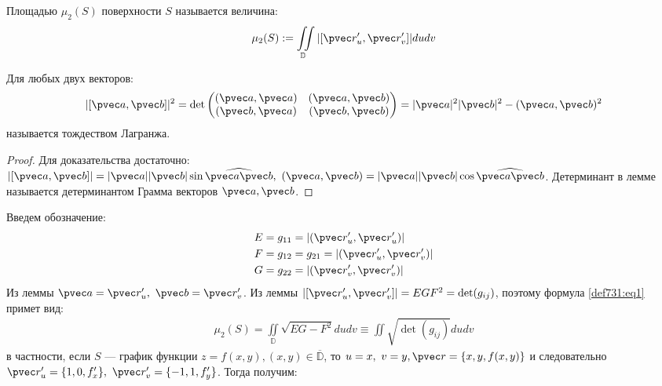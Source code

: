 \begin{definition}
  \label{def731}
  Площадью $\mu_2(S)$ поверхности $S$ называется величина:
  \begin{gather}
    \mu_2(S) := \iint\limits_{\mathbb{D}} |[\pvec r_u', \pvec r_v']| du dv
    \label{def731:eq1}
  \end{gather}
\end{definition}

\begin{lemma}
  Для любых двух векторов:
  \begin{gather*}
    |[\pvec a, \pvec b]|^2 = \det
    \begin{pmatrix}
      (\pvec a, \pvec a) & (\pvec a, \pvec b) \\
      (\pvec b, \pvec a) & (\pvec b, \pvec b)
    \end{pmatrix} =
    |\pvec a|^2 |\pvec b|^2 - (\pvec a, \pvec b)^2
  \end{gather*}
  называется тождеством Лагранжа.
\end{lemma}

\begin{proof}
  Для доказательства достаточно: $|[\pvec a, \pvec b]| = |\pvec a||\pvec b|
  \sin \widehat{\pvec a \pvec b}, \ (\pvec a, \pvec b) = |\pvec a||\pvec b|
  \cos \widehat{\pvec a \pvec b}$. Детерминант в лемме называется детерминантом
  Грамма векторов $\pvec a, \pvec b$.
\end{proof}

Введем обозначение:
\begin{align}
  E &= g_{11} = |(\pvec r_u', \pvec r_u')| \nonumber \\
  F &= g_{12} = g_{21} = |(\pvec r_u', \pvec r_v')|
  \label{ch73:eq2} \\
  G &= g_{22} = |(\pvec r_v', \pvec r_v')| \nonumber
\end{align}
Из леммы $\pvec a = \pvec r_u', \ \pvec b = \pvec r_v'$. Из леммы $|[\pvec
r_u', \pvec r_v']| = EGF^2 = \det (g_{ij})$, поэтому формула \eqref{def731:eq1}
примет вид:
\begin{gather}
  \mu_2(S) = \iint\limits_{\mathbb{D}} \sqrt{EG - F^2} du dv \equiv \iint
  \sqrt{\det(g_{ij})} du dv
  \label{ch73:eq3}
\end{gather}
в частности, если $S$ --- график функции $z = f(x, y), (x, y) \in
\overline{\mathbb{D}}$, то $u = x, \ v = y, \\ \pvec r = \{x, y, f(x, y)\}$ и
следовательно $\pvec r_u' = \{1, 0, f_x'\}, \ \pvec r_v' = \{-1, 1, f_y'\}$.
Тогда получим:

